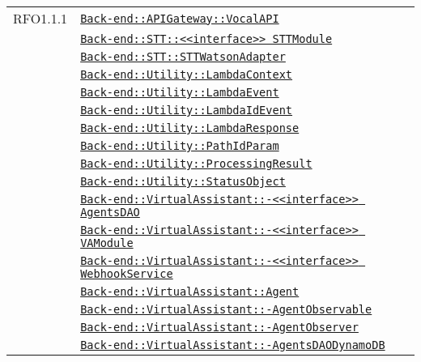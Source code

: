 \begin{longtable}{|>{\centering}m{3cm}|m{10cm}<{\centering}|}
RFO1.1.1 & \hyperref[Back-end::APIGateway::VocalAPI]{\texttt{Back-end::APIGateway::VocalAPI}}\\
& \hyperref[Back-end::STT::<<interface>> STTModule]{\texttt{Back-end::STT::<<interface>> STTModule}}\\
& \hyperref[Back-end::STT::STTWatsonAdapter]{\texttt{Back-end::STT::STTWatsonAdapter}}\\
& \hyperref[Back-end::Utility::LambdaContext]{\texttt{Back-end::Utility::LambdaContext}}\\
& \hyperref[Back-end::Utility::LambdaEvent]{\texttt{Back-end::Utility::LambdaEvent}}\\
& \hyperref[Back-end::Utility::LambdaIdEvent]{\texttt{Back-end::Utility::LambdaIdEvent}}\\
& \hyperref[Back-end::Utility::LambdaResponse]{\texttt{Back-end::Utility::LambdaResponse}}\\
& \hyperref[Back-end::Utility::PathIdParam]{\texttt{Back-end::Utility::PathIdParam}}\\
& \hyperref[Back-end::Utility::ProcessingResult]{\texttt{Back-end::Utility::ProcessingResult}}\\
& \hyperref[Back-end::Utility::StatusObject]{\texttt{Back-end::Utility::StatusObject}}\\
& \hyperref[Back-end::VirtualAssistant::<<interface>> AgentsDAO]{\texttt{Back-end::VirtualAssistant::-\linebreak <<interface>> AgentsDAO}}\\
& \hyperref[Back-end::VirtualAssistant::<<interface>> VAModule]{\texttt{Back-end::VirtualAssistant::-\linebreak <<interface>> VAModule}}\\
& \hyperref[Back-end::VirtualAssistant::<<interface>> WebhookService]{\texttt{Back-end::VirtualAssistant::-\linebreak <<interface>> WebhookService}}\\
& \hyperref[Back-end::VirtualAssistant::Agent]{\texttt{Back-end::VirtualAssistant::Agent}}\\
& \hyperref[Back-end::VirtualAssistant::AgentObservable]{\texttt{Back-end::VirtualAssistant::-\linebreak AgentObservable}}\\
& \hyperref[Back-end::VirtualAssistant::AgentObserver]{\texttt{Back-end::VirtualAssistant::-\linebreak AgentObserver}}\\
& \hyperref[Back-end::VirtualAssistant::AgentsDAODynamoDB]{\texttt{Back-end::VirtualAssistant::-\linebreak AgentsDAODynamoDB}}\\

\end{longtable}
